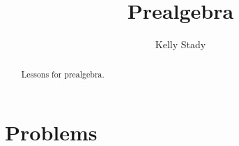 \documentclass{xourse}
\title{Prealgebra}
\author{Kelly Stady}
\begin{document}
\begin{abstract}
    Lessons for prealgebra.
\end{abstract}
\maketitle

\part{Problems}  %

\end{document}
